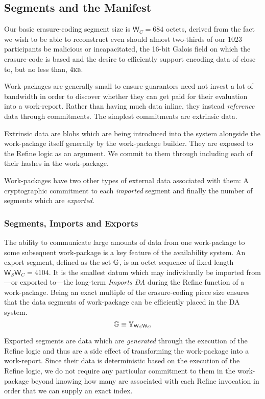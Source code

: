 \subsection{Segments and the Manifest}

Our basic erasure-coding segment size is $\mathsf{W}_C = 684$ octets, derived from the fact we wish to be able to reconstruct even should almost two-thirds of our 1023 participants be malicious or incapacitated, the 16-bit Galois field on which the erasure-code is based and the desire to efficiently support encoding data of close to, but no less than, 4\textsc{kb}.

Work-packages are generally small to ensure guarantors need not invest a lot of bandwidth in order to discover whether they can get paid for their evaluation into a work-report. Rather than having much data inline, they instead \emph{reference} data through commitments. The simplest commitments are extrinsic data.

Extrinsic data are blobs which are being introduced into the system alongside the work-package itself generally by the work-package builder. They are exposed to the Refine logic as an argument. We commit to them through including each of their hashes in the work-package.

Work-packages have two other types of external data associated with them: A cryptographic commitment to each \emph{imported} segment and finally the number of segments which are \emph{exported}.

\subsubsection{Segments, Imports and Exports}

The ability to communicate large amounts of data from one work-package to some subsequent work-package is a key feature of the \Jam availability system. An export segment, defined as the set $\mathbb{G}$, is an octet sequence of fixed length $\mathsf{W}_S\mathsf{W}_C = 4104$. It is the smallest datum which may individually be imported from---or exported to---the long-term \emph{Imports DA} during the Refine function of a work-package. Being an exact multiple of the erasure-coding piece size ensures that the data segments of work-package can be efficiently placed in the DA system.
\begin{equation}\label{eq:segment}
  \mathbb{G} \equiv \mathbb{Y}_{\mathsf{W}_S\mathsf{W}_C}
\end{equation}

Exported segments are data which are \emph{generated} through the execution of the Refine logic and thus are a side effect of transforming the work-package into a work-report. Since their data is deterministic based on the execution of the Refine logic, we do not require any particular commitment to them in the work-package beyond knowing how many are associated with each Refine invocation in order that we can supply an exact index.

